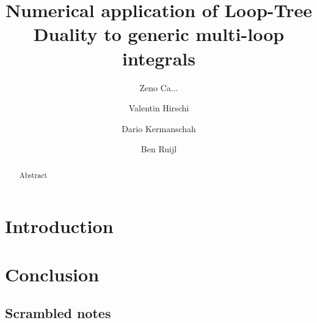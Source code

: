 \documentclass[preprint,11pt]{article}
\title{\textbf{Numerical application of Loop-Tree Duality to generic multi-loop integrals}}
\date{}
\author[1]{Zeno Ca...}
\author[2]{Valentin Hirschi}
\author[3]{Dario Kermanschah}
\author[4]{Ben Ruijl}
\affil[1,2,3,4]{\emph{\small ETH Z\"urich, %
R\"amistrasse 101, %
8092 Z\"urich, Switzerland}}
\numberwithin{equation}{section}
\begin{document}
\maketitle
\thispagestyle{fancy}

\begin{abstract}

	Abstract

\end{abstract}

\clearpage

\setcounter{tocdepth}{1}
\tableofcontents


\section{Introduction}
\label{sec:introduction}


\section{Conclusion}
\label{sec:conclusion}


\begin{appendices}


\section{Scrambled notes}
\label{app:scrambled_notes}


\end{appendices}


%


\end{document}
